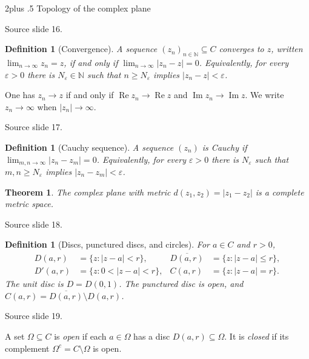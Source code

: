 \documentclass[10pt,letterpaper,twoside,openright]{amsbook}
\makeatletter
\numberwithin{equation}{subsection}
\renewcommand{\section}{\@startsection{section}{1}
 {\z@}{2\baselineskip plus .5\baselineskip}
 {\baselineskip}{\normalfont\Large\bfseries\centering}}
\theoremstyle{sea-plain}
\newtheorem{theorem}[subsection]{Theorem}
\theoremstyle{sea-definition}
\newtheorem{definition}[subsection]{Definition}
\theoremstyle{sea-exercise}
\DeclareMathOperator{\Real}{Re}
\DeclareMathOperator{\Imag}{Im}
\newcommand{\NN}{\mathbb{N}}
\newcommand{\RR}{\mathbb{R}}
\newcommand{\CC}{\mathbb{C}}
\newcommand{\DD}{\mathbb{D}}
\newcommand{\HH}{\mathbb{H}}
\newcommand{\Chat}{\mathbb{C}_{\infty}}
\def\CC{C}\def\RR{R}\def\DD{D}\def\HH{H}\def\Chat{C infinity}}
\newcommand{\src}[1]{\par\smallskip\noindent
 {\scriptsize\sffamily\color{SoftWhite}Source slide #1.}\par\nopagebreak\smallskip}
\makeatother
\begin{document}
\section{Topology of the complex plane}
\src{16}
\begin{definition}[Convergence]
A sequence $(z_n)_{n\in\NN}\subseteq\CC$ converges to $z$, written
$\lim_{n\to\infty}z_n=z$, if and only if $\lim_{n\to\infty}|z_n-z|=0$.
Equivalently, for every $\varepsilon>0$ there is $N_\varepsilon\in\NN$ such
that $n\geq N_\varepsilon$ implies $|z_n-z|<\varepsilon$.
\end{definition}
One has $z_n\to z$ if and only if
$\Real z_n\to\Real z$ and $\Imag z_n\to\Imag z$.
We write $z_n\to\infty$ when $|z_n|\to\infty$.
\src{17}
\begin{definition}[Cauchy sequence]
A sequence $(z_n)$ is Cauchy if
$\lim_{m,n\to\infty}|z_n-z_m|=0$. Equivalently, for every $\varepsilon>0$
there is $N_\varepsilon$ such that $m,n\geq N_\varepsilon$ implies
$|z_n-z_m|<\varepsilon$.
\end{definition}
\begin{theorem}
The complex plane with metric $d(z_1,z_2)=|z_1-z_2|$ is a complete metric space.
\end{theorem}
\src{18}
\begin{definition}[Discs, punctured discs, and circles]
For $a\in\CC$ and $r>0$,
\[
\begin{aligned}
D(a,r)&=\{z:|z-a|<r\},&
\overline{D(a,r)}&=\{z:|z-a|\leq r\},\\
D'(a,r)&=\{z:0<|z-a|<r\},&
C(a,r)&=\{z:|z-a|=r\}.
\end{aligned}
\]
The unit disc is $\DD=D(0,1)$. The punctured disc is open, and
$C(a,r)=\overline{D(a,r)}\setminus D(a,r)$.
\end{definition}
\src{19}
A set $\Omega\subseteq\CC$ is \emph{open} if each $a\in\Omega$ has a disc
$D(a,r)\subseteq\Omega$. It is \emph{closed} if its complement
$\Omega^c=\CC\setminus\Omega$ is open.
\end{document}
